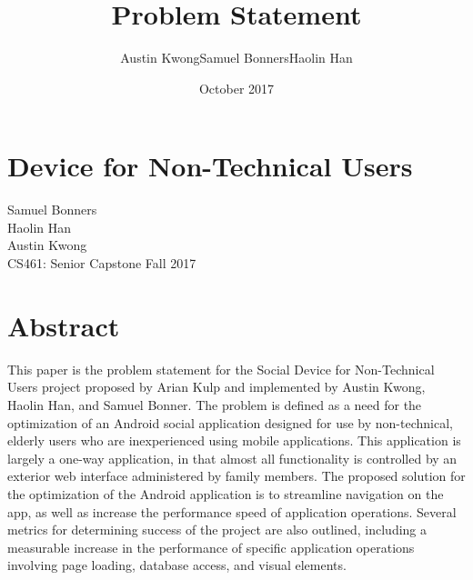 \documentclass[letterpaper,10pt,draftclsnofoot,onecolumn]{IEEEtran}
\title{\newline\newline\newline Problem Statement}
\author{Austin Kwong\newline Samuel Bonners\newline Haolin Han}
\date{October 2017}
\begin{document}
\clearpage


\section*{\newline\newline\newline Device for Non-Technical Users}
\begin{center}
\vspace{20mm}
Samuel Bonners\\
Haolin Han\\
Austin Kwong\\
\vspace{10mm}
CS461: Senior Capstone Fall 2017
\end{center}

\vfill
\section*{Abstract}
This paper is the problem statement for the Social Device for Non-Technical Users project proposed by Arian Kulp and implemented by Austin Kwong, Haolin Han, and Samuel Bonner. The problem is defined as a need for the optimization of an Android social application designed for use by non-technical, elderly users who are inexperienced using mobile applications. This application is largely a one-way application, in that almost all functionality is controlled by an exterior web interface administered by family members. The proposed solution for the optimization of the Android application is to streamline navigation on the app, as well as increase the performance speed of application operations. Several metrics for determining success of the project are also outlined, including a measurable increase in the performance of specific application operations involving page loading, database access, and visual elements.
\vspace{50mm}

\newpage
\end{document}
